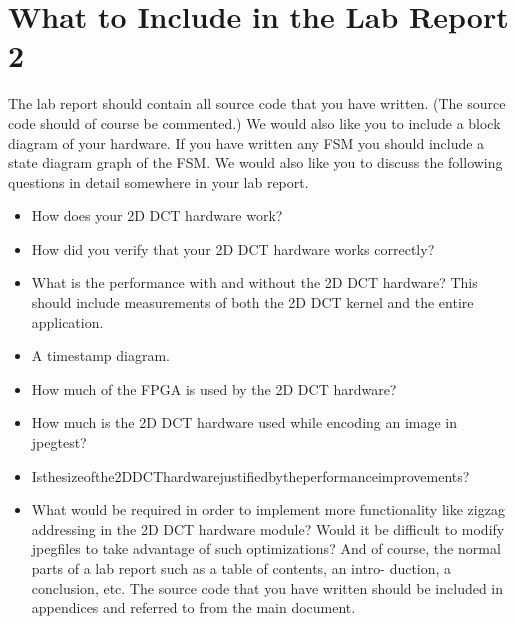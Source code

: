 \documentclass[a4paper]{article}
\begin{document}
\section{What to Include in the Lab Report 2}
The lab report should contain all source code that you have written. (The source code should of course be commented.) We would also like you to include a block diagram of your hardware. If you have written any FSM you should include a state diagram graph of the FSM.
We would also like you to discuss the following questions in detail somewhere in your lab report.
\begin{itemize}
\item How does your 2D DCT hardware work?
\item How did you verify that your 2D DCT hardware works correctly?
\item What is the performance with and without the 2D DCT hardware? This should include measurements of both the 2D DCT kernel and the entire application.
\item A timestamp diagram.
\item How much of the FPGA is used by the 2D DCT hardware?
\item How much is the 2D DCT hardware used while encoding an image in jpegtest?
\item Isthesizeofthe2DDCThardwarejustifiedbytheperformanceimprovements?
\item What would be required in order to implement more functionality like zigzag addressing in the 2D DCT hardware module? Would it be difficult to modify jpegfiles to take advantage of such optimizations?
And of course, the normal parts of a lab report such as a table of contents, an intro- duction, a conclusion, etc. The source code that you have written should be included in appendices and referred to from the main document.
\end{itemize}
\end{document}
